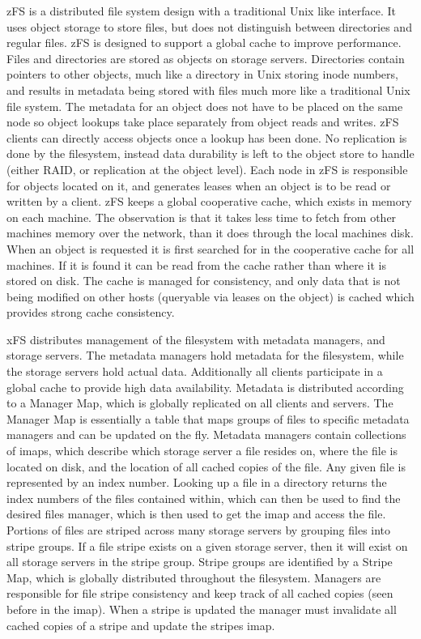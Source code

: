zFS \cite{Rodeh2003} is a distributed file system design with a traditional
Unix like interface. It uses object storage to store files, but does not
distinguish between directories and regular files. zFS is designed to support
a global cache to improve performance. Files and directories are stored as
objects on storage servers. Directories contain pointers to other objects,
much like a directory in Unix storing inode numbers, and results in metadata
being stored with files much more like a traditional Unix file system. The
metadata for an object does not have to be placed on the same node so object
lookups take place separately from object reads and writes. zFS clients can
directly access objects once a lookup has been done. No replication is done by
the filesystem, instead data durability is left to the object store to handle
(either RAID, or replication at the object level). Each node in zFS is
responsible for objects located on it, and generates leases when an object is
to be read or written by a client. zFS keeps a global cooperative cache, which
exists in memory on each machine. The observation is that it takes less time
to fetch from other machines memory over the network, than it does through the
local machines disk. When an object is requested it is first searched for in
the cooperative cache for all machines. If it is found it can be read from the
cache rather than where it is stored on disk. The cache is managed for
consistency, and only data that is not being modified on other hosts
(queryable via leases on the object) is cached which provides strong cache
consistency.


xFS \cite{Anderson1996} distributes management of the filesystem with metadata
managers, and storage servers. The metadata managers hold metadata for the
filesystem, while the storage servers hold actual data. Additionally all
clients participate in a global cache to provide high data availability.
Metadata is distributed according to a Manager Map, which is globally
replicated on all clients and servers. The Manager Map is essentially a table
that maps groups of files to specific metadata managers and can be updated on
the fly. Metadata managers contain collections of imaps, which describe which
storage server a file resides on, where the file is located on disk, and the
location of all cached copies of the file. Any given file is represented by an
index number. Looking up a file in a directory returns the index numbers of
the files contained within, which can then be used to find the desired files
manager, which is then used to get the imap and access the file. Portions of
files are striped across many storage servers by grouping files into stripe
groups. If a file stripe exists on a given storage server, then it will exist
on all storage servers in the stripe group. Stripe groups are identified by a
Stripe Map, which is globally distributed throughout the filesystem. Managers
are responsible for file stripe consistency and keep track of all cached
copies (seen before in the imap). When a stripe is updated the manager must
invalidate all cached copies of a stripe and update the stripes imap.


